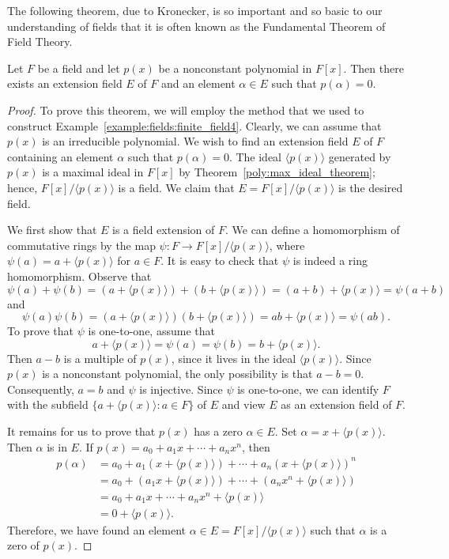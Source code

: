 The following theorem, due to Kronecker, is so important and so basic 
to our understanding of fields that it is often known as the
Fundamental Theorem of Field Theory.
 

\begin{theorem}\label{fields:ext_exist_theorem}
Let $F$ be a field and let $p(x)$ be a nonconstant polynomial in
$F[x]$.  Then there exists an extension field $E$ of $F$ and an 
element $\alpha \in E$ such that $p(\alpha) = 0$. 
\end{theorem}
 

\begin{proof}
To prove this theorem, we will employ the method that we used to
construct Example~\ref{example:fields:finite_field4}. Clearly, we can assume that $p(x)$ is an
irreducible polynomial. We wish to find an extension field $E$ of $F$
containing an element $\alpha$ such that $p(\alpha) = 0$. The ideal
$\langle p(x) \rangle$ generated by $p(x)$ is a maximal ideal in
$F[x]$ by Theorem~\ref{poly:max_ideal_theorem}; hence, $F[x]/\langle p(x) \rangle$ is a
field. We claim that $E = F[x]/\langle p(x) \rangle$ is the desired 
field.  


We first show that $E$ is a field extension of $F$. We can define a
homomorphism of commutative rings by the map
\mbox{$\psi:F \rightarrow F[x]/\langle p(x) \rangle$}, where $\psi(a) = a +
\langle p(x)\rangle$ for $a \in F$. It is easy to check that $\psi$ is
indeed a ring homomorphism.  Observe that 
\[
\psi( a ) + \psi( b ) = (a + \langle p(x) \rangle) + (b + \langle p(x)
\rangle) = (a + b) + \langle p(x) \rangle = \psi( a + b ) 
\]
and
\[
\psi( a )  \psi( b ) = (a  + \langle p(x) \rangle)  (b + \langle p(x)
\rangle) = a  b  + \langle p(x) \rangle = \psi( a  b ). 
\]
To prove that $\psi$ is one-to-one, assume that
\[
a + \langle p(x) \rangle = \psi(a) = \psi(b) = b + \langle p(x)
\rangle. 
\]
Then $a - b$ is a multiple of $p(x)$, since it lives in the
ideal $\langle p(x) \rangle$. Since $p(x)$ is a nonconstant
polynomial, the only possibility is that \mbox{$a - b = 0$}.
Consequently, $a = b$ and $\psi$ is injective. Since $\psi$ is
one-to-one, we can identify $F$ with the subfield $\{ a + \langle p(x)
\rangle : a \in F \}$ of $E$ and view $E$ as an extension field of $F$.
 

It remains for us to prove that $p(x)$ has a zero $\alpha \in E$. Set
$\alpha = x + \langle p(x) \rangle$. Then $\alpha$ is in $E$. If $p(x) =
a_0 + a_1 x + \cdots + a_n x^n$, then %
\begin{align*}
p( \alpha )
& = 
a_0 + a_1( x + \langle p(x) \rangle) + \cdots + a_n ( x + \langle p(x)
\rangle)^n \\
& = 
a_0 + ( a_1 x + \langle p(x) \rangle) + \cdots + (a_n  x^n + \langle p(x)
\rangle) \\
& = 
a_0 + a_1 x + \cdots + a_n x^n + \langle p(x) \rangle \\
& = 
0 + \langle p(x) \rangle.
\end{align*}
Therefore, we have found an element $\alpha \in E = F[x]/\langle p(x)
\rangle$ such that $\alpha$ is a zero of $p(x)$.
\end{proof}
 


